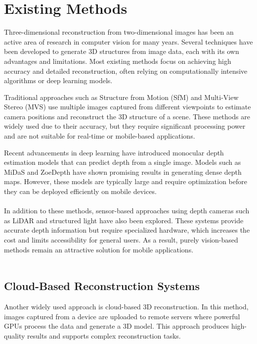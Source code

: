 \chapter{Existing Methods}

Three-dimensional reconstruction from two-dimensional images has been an active area of research in computer vision for many years. Several techniques have been developed to generate 3D structures from image data, each with its own advantages and limitations. Most existing methods focus on achieving high accuracy and detailed reconstruction, often relying on computationally intensive algorithms or deep learning models.

Traditional approaches such as Structure from Motion (SfM) and Multi-View Stereo (MVS) use multiple images captured from different viewpoints to estimate camera positions and reconstruct the 3D structure of a scene. These methods are widely used due to their accuracy, but they require significant processing power and are not suitable for real-time or mobile-based applications.

Recent advancements in deep learning have introduced monocular depth estimation models that can predict depth from a single image. Models such as MiDaS and ZoeDepth have shown promising results in generating dense depth maps. However, these models are typically large and require optimization before they can be deployed efficiently on mobile devices. \\ \\

In addition to these methods, sensor-based approaches using depth cameras such as LiDAR and structured light have also been explored. These systems provide accurate depth information but require specialized hardware, which increases the cost and limits accessibility for general users. As a result, purely vision-based methods remain an attractive solution for mobile applications. \\ \\

\section{Cloud-Based Reconstruction Systems}

Another widely used approach is cloud-based 3D reconstruction. In this method, images captured from a device are uploaded to remote servers where powerful GPUs process the data and generate a 3D model. This approach produces high-quality results and supports complex reconstruction tasks.

